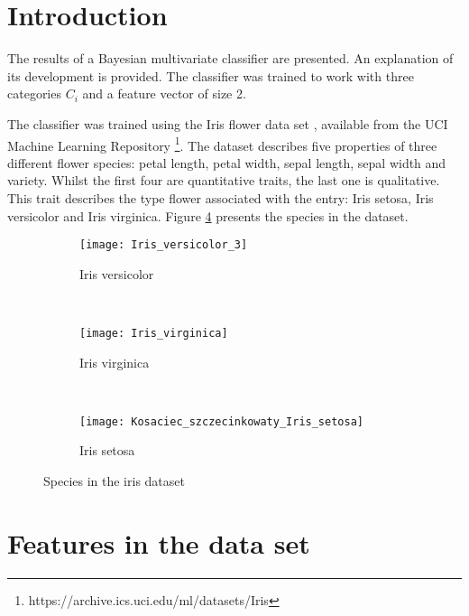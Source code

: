 \section{Introduction}

The results of a Bayesian multivariate classifier are presented.
An explanation of its development is provided.
The classifier was trained to work with three categories $C_i$ and a
feature vector of size 2.

The classifier was trained using the Iris flower data set
\cite{fisher1936iris}, available from the UCI Machine
Learning Repository \footnote{https://archive.ics.uci.edu/ml/datasets/Iris}.
The dataset describes five properties of three different flower species:
petal length, petal width, sepal length, sepal width and variety.
Whilst the first four are quantitative traits, the last one is qualitative.
This trait describes the type flower associated with the entry:
Iris setosa, Iris versicolor and Iris virginica.
Figure \ref{fig: iris} presents the species in the dataset.


\begin{figure}[htb!]
    \centering
    \begin{subfigure}[b]{0.3\textwidth}
        \texttt{[image: Iris\_versicolor\_3]}
        \caption{Iris versicolor}
        \label{fig: versicolor}
    \end{subfigure}
    ~ %
    \begin{subfigure}[b]{0.3\textwidth}
        \texttt{[image: Iris\_virginica]}
        \caption{Iris virginica}
        \label{fig: virginica}
    \end{subfigure}
    ~ %
    \begin{subfigure}[b]{0.3\textwidth}
        \texttt{[image: Kosaciec\_szczecinkowaty\_Iris\_setosa]}
        \caption{Iris setosa}
        \label{fig: setosa}
    \end{subfigure}
    \caption{Species in the iris dataset}\label{fig: iris}
\end{figure}

\section{Features in the data set}

